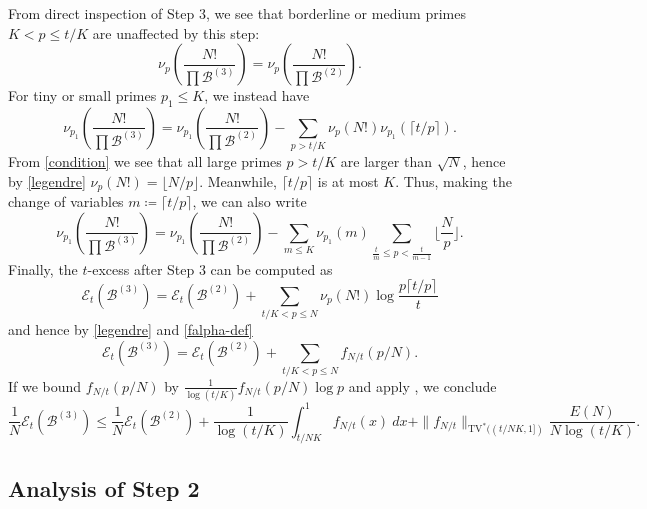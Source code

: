 \documentclass[12pt,a4paper,reqno]{amsart}
\numberwithin{equation}{section}
\theoremstyle{plain}
\theoremstyle{definition}
\newcommand\tuple{{\mathcal B}}
\newcommand\excess{{\mathcal{E}}}
\begin{document}
From direct inspection of Step 3, we see that  borderline or medium primes $K < p \leq t/K$ are unaffected by this step:
\begin{equation}\label{step3-unaffected}
  \nu_p\left(\frac{N!}{\prod \tuple^{(3)}}\right) = \nu_p\left(\frac{N!}{\prod \tuple^{(2)}}\right).
\end{equation}
For tiny or small primes $p_1 \leq K$, we instead have
$$
\nu_{p_1}\left(\frac{N!}{\prod \tuple^{(3)}}\right) = \nu_{p_1}\left(\frac{N!}{\prod \tuple^{(2)}}\right) - \sum_{p > t/K} \nu_p(N!) \nu_{p_1}( \lceil t/p \rceil ).$$
From \eqref{condition} we see that all large primes $p>t/K$ are larger than $\sqrt{N}$, hence by \eqref{legendre} $\nu_p(N!) = \lfloor N/p\rfloor$.  Meanwhile, $\lceil t/p \rceil$ is at most $K$.  Thus, making the change of variables $m \coloneqq \lceil t/p \rceil$, we can also write
\begin{equation}\label{step3-affected}
\nu_{p_1}\left(\frac{N!}{\prod \tuple^{(3)}}\right) = \nu_{p_1}\left(\frac{N!}{\prod \tuple^{(2)}}\right) - \sum_{m \leq K} \nu_{p_1}(m) \sum_{\frac{t}{m} \leq p < \frac{t}{m-1}} \lfloor \frac{N}{p} \rfloor.
\end{equation}
Finally, the $t$-excess after Step 3 can be computed as
$$
\excess_t(\tuple^{(3)}) = 
\excess_t(\tuple^{(2)}) + \sum_{t/K < p \leq N} \nu_p(N!) \log \frac{p \lceil t/p \rceil}{t}$$
and hence by \eqref{legendre} and \eqref{falpha-def}
$$
\excess_t(\tuple^{(3)}) = 
\excess_t(\tuple^{(2)}) + \sum_{t/K < p \leq N} f_{N/t}(p/N).$$
If we bound $f_{N/t}(p/N)$ by $\frac{1}{\log(t/K)} f_{N/t}(p/N) \log p$ and apply , we conclude
\begin{equation}\label{step3-excess}
\frac{1}{N} \excess_t(\tuple^{(3)}) \leq 
 \frac{1}{N}\excess_t(\tuple^{(2)}) + \frac{1}{\log(t/K)} \int_{t/NK}^1 f_{N/t}(x)\ dx + \|f_{N/t}\|_{\mathrm{TV}^*((t/NK,1])} \frac{E(N)}{N \log(t/K)}.  
\end{equation}


\subsection{Analysis of Step 2}
\end{document}
